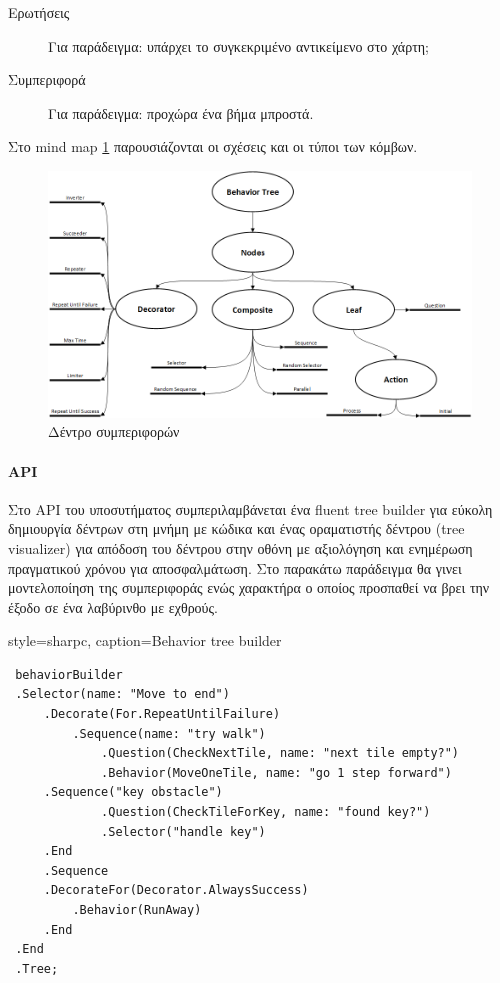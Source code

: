\begin{description}
	\item [Ερωτήσεις] Για παράδειγμα: υπάρχει το συγκεκριμένο αντικείμενο στο χάρτη;
	\item [Συμπεριφορά] Για παράδειγμα: προχώρα ένα βήμα μπροστά.
\end{description}

Στο mind map \ref{fig:behavior_trees_mind_map} παρουσιάζονται οι σχέσεις και οι τύποι των κόμβων.
\begin{figure}[h!]
	\centering
	\includegraphics[width=165mm]{Images/behavior_trees}
	\caption{Δέντρο συμπεριφορών}
	\label{fig:behavior_trees_mind_map}
\end{figure}
	
\paragraph{API}
Στο \gls{API} του υποσυτήματος συμπεριλαμβάνεται ένα fluent tree builder για εύκολη δημιουργία δέντρων στη μνήμη με κώδικα και ένας οραματιστής δέντρου (tree visualizer) για απόδοση του δέντρου στην οθόνη με αξιολόγηση και ενημέρωση πραγματικού χρόνου για αποσφαλμάτωση. Στο παρακάτω παράδειγμα θα γινει μοντελοποίηση της συμπεριφοράς ενώς χαρακτήρα ο οποίος προσπαθεί να βρει την έξοδο σε ένα λαβύρινθο με εχθρούς.

	\lstset
	{
		style=sharpc, 
		caption={Behavior tree builder}
	}
	\begin{lstlisting}	
 behaviorBuilder
 .Selector(name: "Move to end")
	 .Decorate(For.RepeatUntilFailure)
		 .Sequence(name: "try walk")
			 .Question(CheckNextTile, name: "next tile empty?")
			 .Behavior(MoveOneTile, name: "go 1 step forward")
	 .Sequence("key obstacle")
			 .Question(CheckTileForKey, name: "found key?")
			 .Selector("handle key")
	 .End
	 .Sequence
	 .DecorateFor(Decorator.AlwaysSuccess)
		 .Behavior(RunAway)
	 .End
 .End
 .Tree;
	\end{lstlisting}


